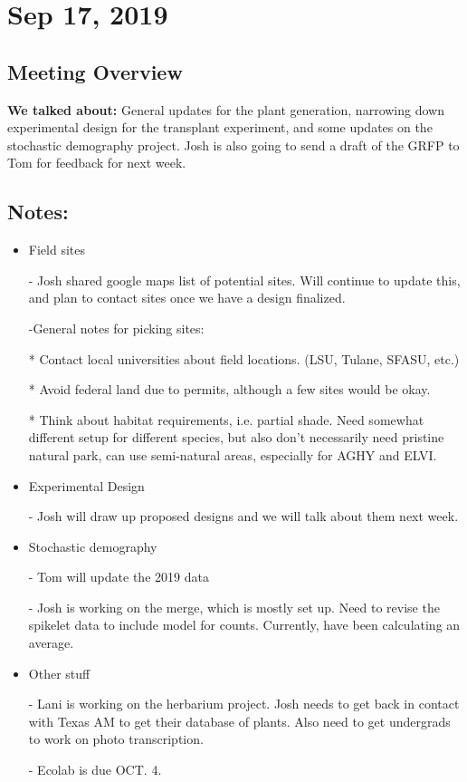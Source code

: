 \documentclass{article}
\begin{document}
 
 \section*{Sep 17, 2019}
 \subsection*{Meeting Overview}
 \textbf{We talked about:}
 General updates for the plant generation, narrowing down experimental design for the transplant experiment, and some updates on the stochastic demography project. Josh is also going to send a draft of the GRFP to Tom for feedback for next week. 
 
 \subsection*{Notes:}
 \begin{itemize}
 \item{Field sites}
 
 - Josh shared google maps list of potential sites. Will continue to update this, and plan to contact sites once we have a design finalized.
 
 -General notes for picking sites:
 
 * Contact local universities about field locations. (LSU, Tulane, SFASU, etc.)
 
 * Avoid federal land due to permits, although a few sites would be okay.
 
 * Think about habitat requirements, i.e. partial shade. Need somewhat different setup for different species, but also don't necessarily need pristine natural park, can use semi-natural areas, especially for AGHY and ELVI. 
 
 \item{Experimental Design}
 
 - Josh will draw up proposed designs and we will talk about them next week. 
 
 
 \item{Stochastic demography}
 
 - Tom will update the 2019 data
 
 - Josh is working on the merge, which is mostly set up. Need to revise the spikelet data to include model for counts. Currently, have been calculating an average. 
 
 \item{Other stuff}
 
 - Lani is working on the herbarium project. Josh needs to get back in contact with Texas AM to get their database of plants. Also need to get undergrads to work on photo transcription.
 
 - Ecolab is due OCT. 4.
 
 \end{itemize}
 
\end{document}
